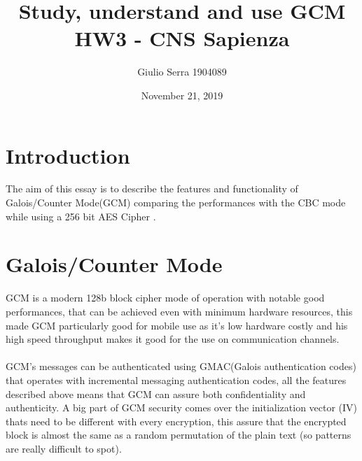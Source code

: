 \documentclass{article}
\begin{document}
\pagecolor{white}

\title{%
  Study, understand and use GCM \\
  \large HW3 - CNS Sapienza}

\author{Giulio Serra 1904089}
\date{November 21, 2019}

\maketitle

\begin{titlepage}
\end{titlepage}

\tableofcontents

\begin{titlepage}
\end{titlepage}

\section{Introduction}\label{sec:intro}
The aim of this essay is to describe the features and functionality of Galois/Counter Mode(GCM) comparing the performances with the CBC mode while using a 256 bit AES Cipher .\\

\section{Galois/Counter Mode}\label{sec:gcm}

GCM is a modern 128b block cipher mode of operation with notable good performances, that can be achieved even with minimum hardware resources, this made GCM particularly good for mobile use as it's low hardware costly and his high speed throughput  makes it good for the use on communication channels.\\\\
GCM's messages can be authenticated using GMAC(Galois authentication codes) that operates with incremental messaging authentication codes, all the features described above means that GCM can assure both confidentiality and authenticity.
A big part of GCM security comes over the initialization vector (IV) thats need to be different with every encryption, this assure that the encrypted block is almost the same as a random permutation of the plain text (so patterns are really difficult to spot).
\end{document}
